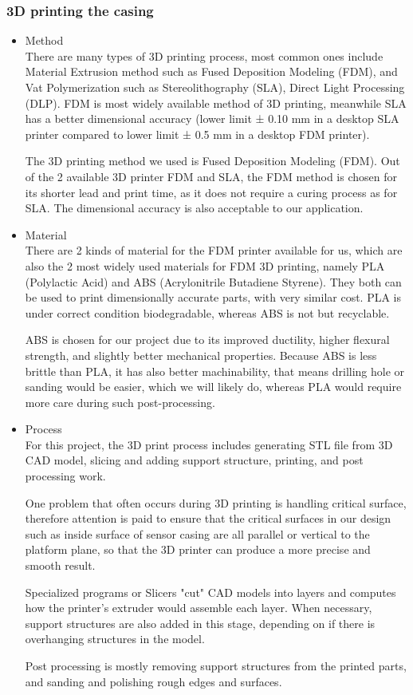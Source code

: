 \subsubsection{3D printing the casing}
\begin{itemize}
    \item Method\\ 
    There are many types of 3D printing process, most common ones include Material Extrusion method such as Fused Deposition Modeling (FDM), and Vat Polymerization such as Stereolithography (SLA), Direct Light Processing (DLP). FDM is most widely available method of 3D printing, meanwhile SLA has a better dimensional accuracy (lower limit ± 0.10 mm in a desktop SLA printer compared to lower limit ± 0.5 mm in a desktop FDM printer).

    The 3D printing method we used is Fused Deposition Modeling (FDM). Out of the 2 available 3D printer FDM and SLA, the FDM method is chosen for its shorter lead and print time, as it does not require a curing process as for SLA. The dimensional accuracy is also acceptable to our application.

    \item Material\\ 
    There are 2 kinds of material for the FDM printer available for us, which are also the 2 most widely used materials for FDM 3D printing, namely PLA (Polylactic Acid) and ABS (Acrylonitrile Butadiene Styrene). They both can be used to print dimensionally accurate parts, with very similar cost. PLA is under correct condition biodegradable, whereas ABS is not but recyclable.

    ABS is chosen for our project due to its improved ductility, higher flexural strength, and slightly better mechanical properties. Because ABS is less brittle than PLA, it has also better machinability, that means drilling hole or sanding would be easier, which we will likely do, whereas PLA would require more care during such post-processing.

    \item Process\\ 
    For this project, the 3D print process includes generating STL file from 3D CAD model, slicing and adding support structure, printing, and post processing work.

    One problem that often occurs during 3D printing is handling critical surface, therefore attention is paid to ensure that the critical surfaces in our design such as inside surface of sensor casing are all parallel or vertical to the platform plane, so that the 3D printer can produce a more precise and smooth result.

    Specialized programs or Slicers "cut" CAD models into layers and computes how the printer's extruder would assemble each layer. When necessary, support structures are also added in this stage, depending on if there is overhanging structures in the model.

    Post processing is mostly removing support structures from the printed parts, and sanding and polishing rough edges and surfaces.
\end{itemize}



